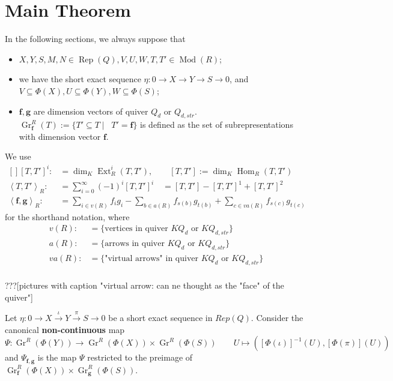 \documentclass[reqno,11pt]{amsart}
\numberwithin{equation}{section}
\theoremstyle{plain}
\theoremstyle{plain}
\numberwithin{equation}{section}
\theoremstyle{remark}
\DeclareMathOperator{\Rep}{\operatorname{Rep}}
\DeclareMathOperator{\Mod}{\operatorname{Mod}}
\DeclareMathOperator{\Hom}{\operatorname{Hom}}
\DeclareMathOperator{\Ext}{\operatorname{Ext}}
\DeclareMathOperator{\dimv}{\operatorname{\underline{\mathbf{dim}}}}
\newcommand{\Grr}{\operatorname{Gr}^{R}}
\newcommand{\dimvec}[1]{\mathbf{#1}}
\begin{document}
\section{Main Theorem}
   
   In the following sections, we always suppose that 
   \begin{itemize}
   		\item $X,Y,S,M,N \in \Rep(Q), V,U,W,T,T' \in \Mod(R)$;
   		\item we have the short exact sequence $\eta:0\longrightarrow X \longrightarrow Y \longrightarrow S \longrightarrow 0$, and $V \subseteq \Phi(X), U \subseteq \Phi(Y), W \subseteq \Phi(S)$;
   		\item $\dimvec{f},\dimvec{g}$ are dimension vectors of quiver $Q_d$ or $Q_{d,str}$. $\Grr_{\dimvec{f}}(T):= \{ T' \subseteq T \mid \dimv T'=\dimvec{f} \}$ is defined as the set of subrepresentations with dimension vector $\dimvec{f}$.
   \end{itemize}
We use 
\begin{equation*}
\begin{aligned}[]
	[T,T']^i:&=\dim_K \Ext^i_R (T,T'),\qquad [T,T']:=\dim_K \Hom_R (T,T')\\
	\left< T,T'\right>_R:&= \sum_{i=0}^{\infty} (-1)^i [T,T']^i \quad=[T,T']-[T,T']^1+[T,T']^2\\
	\left< \dimvec{f},\dimvec{g}\right>_R:&= \sum_{i \in v(R)} f_ig_i - \sum_{b \in a(R)} f_{s(b)}g_{t(b)}+ \sum_{c \in va(R)} f_{s(c)}g_{t(c)}
\end{aligned}
\end{equation*}
for the shorthand notation, where
\begin{equation*}
\begin{aligned}
	v(R):&= \{\text{vertices in quiver $KQ_d$ or $KQ_{d,str}$}\} \\
	a(R):&= \{\text{arrows in quiver $KQ_d$ or $KQ_{d,str}$}\} \\
	va(R):&= \{\text{"virtual arrows" in quiver $KQ_d$ or $KQ_{d,str}$}\} \\
\end{aligned}
\end{equation*}

???[pictures with caption "virtual arrow: can ne thought as the "face" of the quiver"]

Let $\eta: 0\longrightarrow X \stackrel{\iota}{\longrightarrow} Y \stackrel{\pi}{\longrightarrow} S \longrightarrow 0$ be a short exact sequence in $Rep(Q)$. Consider the canonical \textbf{non-continuous} map
$$\Psi: \Grr(\Phi(Y)) \longrightarrow \Grr(\Phi(X)) \times \Grr(\Phi(S)) \qquad U \longmapsto \left([\Phi(\iota)]^{-1}(U),[\Phi(\pi)](U)   \right)$$
and  $\Psi_{\dimvec{f},\dimvec{g}}$ is the map $\Psi$ restricted to the preimage of $\Grr_{\dimvec{f}}(\Phi(X)) \times \Grr_{\dimvec{g}}(\Phi(S))$.
\end{document}
